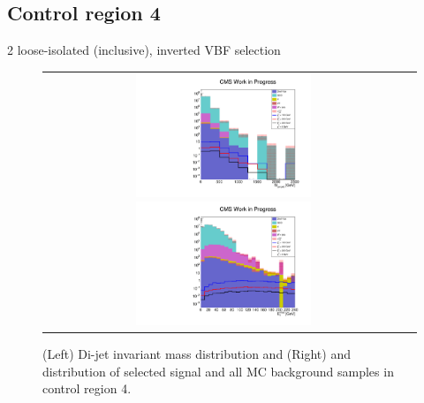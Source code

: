 \subsection*{Control region 4}

\FloatBarrier

2 loose-isolated \hadtau (inclusive), inverted VBF selection

\begin{figure}[tbh!]
	\centering
	\begin{tabular}{cc}
		\includegraphics[width=0.5\textwidth]{analysis/pics/h_dijetinvariantmass_Tau2LooseIsoInclusiveVBFInverted.pdf}
		\includegraphics[width=0.5\textwidth]{analysis/pics/h_met_Tau2LooseIsoInclusiveVBFInverted.pdf} 		
	\end{tabular}
	\caption{(Left) Di-jet invariant mass distribution and (Right) and \met distribution of selected signal and all MC background samples in control region 4.}
	\label{fig::crplots1_Tau2LooseIsoInclusiveVBFInverted_13tev}
\end{figure}

